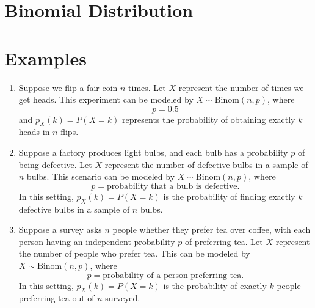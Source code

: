 \documentclass{article}
\begin{document}
\section*{Binomial Distribution}

\section*{Examples}

\begin{enumerate}
    \item Suppose we flip a fair coin \( n \) times. Let \( X \) represent the number of times we get heads. This experiment can be modeled by \( X \sim \text{Binom}(n, p) \), where
    \[
    p = 0.5
    \]
    and \( p_X(k) = P(X = k) \) represents the probability of obtaining exactly \( k \) heads in \( n \) flips.

    \item Suppose a factory produces light bulbs, and each bulb has a probability \( p \) of being defective. Let \( X \) represent the number of defective bulbs in a sample of \( n \) bulbs. This scenario can be modeled by \( X \sim \text{Binom}(n, p) \), where
    \[
    p = \text{probability that a bulb is defective}.
    \]
    In this setting, \( p_X(k) = P(X = k) \) is the probability of finding exactly \( k \) defective bulbs in a sample of \( n \) bulbs.

    \item Suppose a survey asks \( n \) people whether they prefer tea over coffee, with each person having an independent probability \( p \) of preferring tea. Let \( X \) represent the number of people who prefer tea. This can be modeled by \( X \sim \text{Binom}(n, p) \), where
    \[
    p = \text{probability of a person preferring tea}.
    \]
    In this setting, \( p_X(k) = P(X = k) \) is the probability of exactly \( k \) people preferring tea out of \( n \) surveyed.
\end{enumerate}
\end{document}
